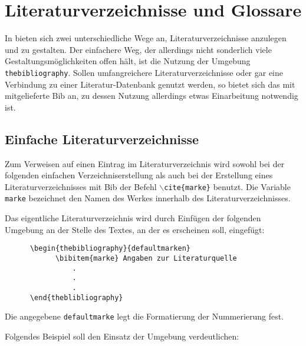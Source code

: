 
%

\chapter{Literaturverzeichnisse und Glossare}
\label{sec:literaturverzeichnisse}

In \DMLLaTeX{} bieten sich zwei unterschiedliche Wege an, Literaturverzeichnisse
anzulegen und zu gestalten. Der einfachere Weg, der allerdings nicht sonderlich
viele Gestaltungsmöglichkeiten offen hält, ist die Nutzung der Umgebung \texttt{thebibliography}. Sollen umfangreichere Literaturverzeichnisse oder gar eine Verbindung zu einer Literatur-Datenbank genutzt werden, so
bietet sich das mit \DMLLaTeX{} mitgelieferte Bib\DMLTeX{} an, zu dessen Nutzung allerdings etwas Einarbeitung notwendig ist.

\section{Einfache Literaturverzeichnisse}

Zum Verweisen auf einen Eintrag im Literaturverzeichnis wird sowohl bei der folgenden
einfachen Verzeichniserstellung als auch bei der Erstellung eines Literaturverzeichnisses
mit Bib\DMLTeX{} der Befehl \texttt{$\backslash$cite\{marke\}} benutzt. Die Variable
\texttt{marke} bezeichnet den Namen des Werkes innerhalb des Literaturverzeichnisses.

Das eigentliche Literaturverzeichnis wird durch Einfügen der folgenden Umgebung an der
Stelle des Textes, an der es erscheinen soll, eingefügt:

\begin{verbatim}
      \begin{thebibliography}{defaultmarken}
            \bibitem{marke} Angaben zur Literaturquelle
                .
                .
                .
      \end{theblibliography}
\end{verbatim}

Die angegebene \texttt{defaultmarke} legt die Formatierung der Nummerierung fest.
\newpage

Folgendes Beispiel soll den Einsatz der Umgebung verdeutlichen:

